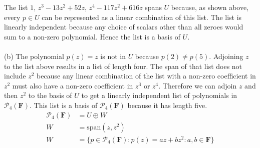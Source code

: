 \documentclass[a4paper]{article}
\begin{document}
The list $1$, $z^3-13z^2+52z$, $z^4-117z^2+616z$ spans $U$ because, as shown above, every $p\in U$ can be represented as a linear combination of this list.
The list is linearly independent because any choice of scalars other than all zeroes would sum to a non-zero polynomial.
Hence the list is a basis of $U$.
\\
\\
(b) The polynomial $p(z)=z$ is not in $U$ because $p(2)\neq p(5)$.
Adjoining $z$ to the list above results in a list of length four.
The span of that list does not include $z^2$ because any linear combination of the list with a non-zero coefficient in $z^2$ must also have a non-zero coefficient in $z^3$ or $z^4$.
Therefore we can adjoin $z$ and then $z^2$ to the basis of $U$ to get a linearly independent list of polynomials in $\mathcal{P}_4(\textbf{F})$. This list is a basis of $\mathcal{P}_4(\textbf{F})$ because it has length five.
\\
\begin{align*}
\tag{c}
\mathcal{P}_4(\textbf{F}) &= U \oplus W \\
W &= \text{span}(z, z^2) \\
W &= \{ p \in \mathcal{P}_4(\textbf{F}) : p(z) = az + bz^2 : a,b \in \textbf{F} \}
\end{align*}
\end{document}
